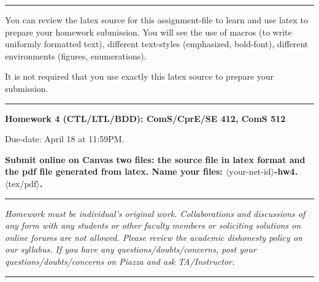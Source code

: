\documentclass[11pt]{article}
\begin{document}
\hrule
\smallskip

\noindent

\noindent
You can review the latex source for this assignment-file to
learn and use latex to prepare your homework submission. You will see
the use of macros (to write uniformly formatted text), different
text-styles (emphasized, bold-font), different environments (figures,
enumerations).

It is not required that you use exactly this latex source to prepare
your submission. 
\smallskip
\hrule


\begin{center}
{\Large\bf Homework 4 (CTL/LTL/BDD): ComS/CprE/SE 412, ComS 512}

\medskip

Due-date: April 18 at 11:59PM.

\medskip


\end{center}

\noindent
\textbf{
Submit online on Canvas two files: the source file in latex format and
the pdf file generated from latex. Name your files:
$\langle\mbox{your-net-id}\rangle$-hw4.$\langle\mbox{tex/pdf}\rangle$.
}

\hrule
\noindent
\smallskip

\emph{ Homework must be individual's original work. Collaborations and
  discussions of any form with any students or other faculty members
  or soliciting solutions on online forums are not allowed. Please
  review the academic dishonesty policy on our syllabus. If you have
  any questions/doubts/concerns, post your questions/doubts/concerns
  on Piazza and ask TA/Instructor.}

\smallskip
\hrule
\end{document}
